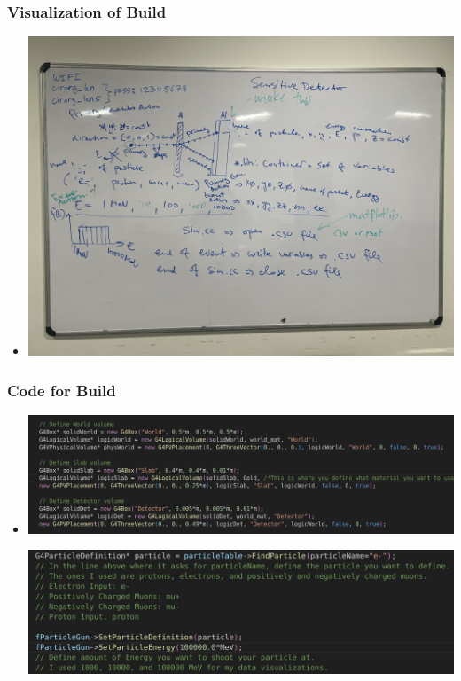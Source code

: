 \documentclass[aspectratio-169]{beamer}
\begin{document}
\begin{frame}
\frametitle{Visualization of Build}
\begin{itemize}
    \item 
    \begin{minipage}{0.85\textwidth}
        \includegraphics[width=\textwidth]{IMG_5434.jpg}
    \end{minipage}
\end{itemize}
\end{frame}


\begin{frame}
\frametitle{Code for Build}
\begin{itemize}
    \item 
    \begin{minipage}{0.85\textwidth}
        \includegraphics[width=\textwidth]{vis-code.png}
    \end{minipage}
    \hfill
    \begin{minipage}{0.85\textwidth}
        \includegraphics[width=\textwidth]{code.png}
    \end{minipage}
\end{itemize}
\end{frame}
\end{document}
